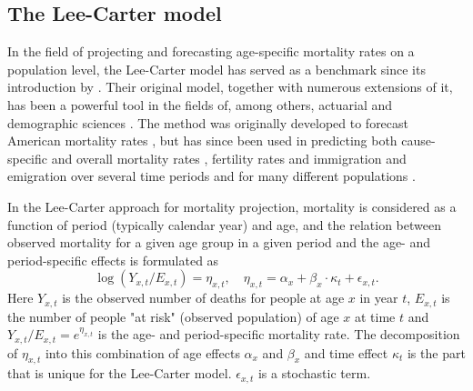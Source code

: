 \subsection{The Lee-Carter model}
\label{section:Lee-Carter}
In the field of projecting and forecasting age-specific mortality rates on a population level, the Lee-Carter model has served as a benchmark since its introduction by \textcite{LeeCarter1992}. Their original model, together with numerous extensions of it, has been a powerful tool in the fields of, among others, actuarial and demographic sciences \parencite{booth_tickle_2008}. The method was originally developed to forecast American mortality rates \parencite{LeeCarter1992}, but has since been used in predicting both cause-specific and overall mortality rates \parencite{GirosiKing2007}, fertility rates and immigration and emigration \parencite{Wisniowski2015} over several time periods and for many different populations . 

\newpar In the Lee-Carter approach for mortality projection, mortality is considered as a function of period (typically calendar year) and age, and the relation between observed mortality for a given age group in a given period and the age- and period-specific effects is formulated as 
\begin{equation}
\log(Y_{x,t}/E_{x,t})  = \eta_{x,t}, \quad \eta_{x,t}= \alpha_x + \beta_x\cdot\kappa_t + \epsilon_{x,t}.
\label{eq:orig-LC-model}
\end{equation}
Here $Y_{x,t}$ is the observed number of deaths for people at age $x$ in year $t$, $E_{x,t}$ is the number of people "at risk" (observed population) of age $x$ at time $t$ and $Y_{x,t}/E_{x,t} = e^{\eta_{x,t}}$ is the age- and period-specific mortality rate. The decomposition of $\eta_{x,t}$ into this combination of age effects $\alpha_x$ and $\beta_x$ and time effect $\kappa_t$ is the part that is unique for the Lee-Carter model. $\epsilon_{x,t}$ is a stochastic term.

